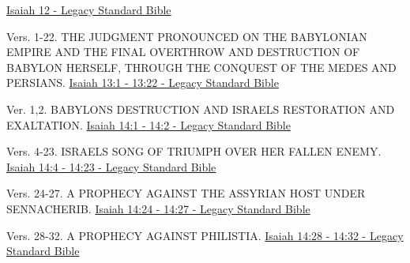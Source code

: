 \documentclass[
  ignorenonframetext,
]{beamer}
\begin{document}
\begin{frame}{12}
\label{section-42}
\href{https://read.lsbible.org/?q=is12}{Isaiah 12 - Legacy Standard
Bible}
\end{frame}

\begin{frame}{13}
\label{section-43}
\begin{block}{Vers. 1-22. THE JUDGMENT PRONOUNCED ON THE BABYLONIAN
EMPIRE AND THE FINAL OVERTHROW AND DESTRUCTION OF BABYLON HERSELF,
THROUGH THE CONQUEST OF THE MEDES AND PERSIANS.}
\label{vers.-1-22.-the-judgment-pronounced-on-the-babylonian-empire-and-the-final-overthrow-and-destruction-of-babylon-herself-through-the-conquest-of-the-medes-and-persians.}
\href{https://read.lsbible.org/?q=is13\%3A1-22}{Isaiah 13:1 - 13:22 -
Legacy Standard Bible}
\end{block}
\end{frame}

\begin{frame}{14}
\label{section-44}
\begin{block}{Ver. 1,2. BABYLON\textquotesingle S DESTRUCTION AND
ISRAEL\textquotesingle S RESTORATION AND EXALTATION.}
\label{ver.-12.-babylons-destruction-and-israels-restoration-and-exaltation.}
\href{https://read.lsbible.org/?q=is14\%3A1-2}{Isaiah 14:1 - 14:2 -
Legacy Standard Bible}
\end{block}

\begin{block}{Vers. 4-23. ISRAEL\textquotesingle S SONG OF TRIUMPH OVER
HER FALLEN ENEMY.}
\label{vers.-4-23.-israels-song-of-triumph-over-her-fallen-enemy.}
\href{https://read.lsbible.org/?q=is14\%3A4-23}{Isaiah 14:4 - 14:23 -
Legacy Standard Bible}
\end{block}

\begin{block}{Vers. 24-27. A PROPHECY AGAINST THE ASSYRIAN HOST UNDER
SENNACHERIB.}
\label{vers.-24-27.-a-prophecy-against-the-assyrian-host-under-sennacherib.}
\href{https://read.lsbible.org/?q=is14\%3A24-27}{Isaiah 14:24 - 14:27 -
Legacy Standard Bible}
\end{block}

\begin{block}{Vers. 28-32. A PROPHECY AGAINST PHILISTIA.}
\label{vers.-28-32.-a-prophecy-against-philistia.}
\href{https://read.lsbible.org/?q=is14\%3A28-32}{Isaiah 14:28 - 14:32 -
Legacy Standard Bible}
\end{block}
\end{frame}
\end{document}
